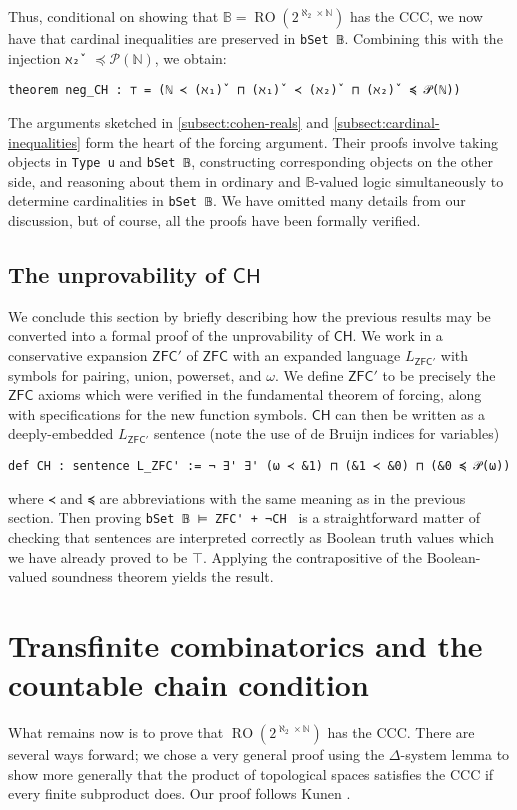 \documentclass[a4paper,USenglish,cleveref, autoref]{lipics-v2019}
\newcommand{\B}{\mathbb{B}}
\newcommand{\lil}{\lstinline}
\theoremstyle{theorem}
\theoremstyle{definition}
\begin{document}
Thus, conditional on showing that $\B = \operatorname{RO}(2^{\aleph_2 \times \mathbb{N}})$ has the CCC, we now have that cardinal inequalities are preserved in \lstinline{bSet 𝔹}. Combining this with the injection \lil{ℵ₂̌ } $\preceq \mathcal{P}(\mathbb{N})$, we obtain:
\begin{lstlisting}
theorem neg_CH : ⊤ = (ℕ ≺ (ℵ₁)̌  ⊓ (ℵ₁)̌  ≺ (ℵ₂)̌  ⊓ (ℵ₂)̌  ≼ 𝒫(ℕ))
\end{lstlisting}

The arguments sketched in \autoref{subsect:cohen-reals} and \autoref{subsect:cardinal-inequalities} form the heart of the forcing argument. Their proofs involve taking objects in \lil{Type u} and \lil{bSet 𝔹}, constructing corresponding objects on the other side, and reasoning about them in ordinary and $\B$-valued logic simultaneously to determine cardinalities in \lstinline{bSet 𝔹}. We have omitted many details from our discussion, but of course, all the proofs have been formally verified.

\subsection{The unprovability of $\mathsf{CH}$} \label{subsect:unprovability}
We conclude this section by briefly describing how the previous results may be converted into a formal proof of the unprovability of $\mathsf{CH}$. We work in a conservative expansion $\mathsf{ZFC}'$ of $\mathsf{ZFC}$ with an expanded language $L_{\mathsf{ZFC}'}$ with symbols for pairing, union, powerset, and $\omega$. We define $\mathsf{ZFC}'$ to be precisely the $\mathsf{ZFC}$ axioms which were verified in the fundamental theorem of forcing, along with specifications for the new function symbols. $\mathsf{CH}$ can then be written as a deeply-embedded $L_{\mathsf{ZFC}'}$ sentence (note the use of de Bruijn indices for variables)
\begin{lstlisting}
def CH : sentence L_ZFC' := ¬ ∃' ∃' (ω ≺ &1) ⊓ (&1 ≺ &0) ⊓ (&0 ≼ 𝒫(ω))
\end{lstlisting}
where \lil{≺} and \lil{≼} are abbreviations with the same meaning as in the previous section. Then proving \lstinline{bSet 𝔹 ⊨ ZFC' + ¬CH } is a straightforward matter of checking that sentences are interpreted correctly as Boolean truth values which we have already proved to be $\top$. Applying the contrapositive of the Boolean-valued soundness theorem yields the result.

\section{Transfinite combinatorics and the countable chain condition}
\label{sect:ccc}
What remains now is to prove that $\operatorname{RO}(2^{\aleph_2 \times \mathbb{N}})$ has the CCC. There are several ways forward; we chose a very general proof using the
$\Delta$-system lemma to show more generally that the product of topological spaces satisfies the CCC if every finite subproduct does. Our proof follows Kunen \cite{kunen2014set}.
\end{document}

